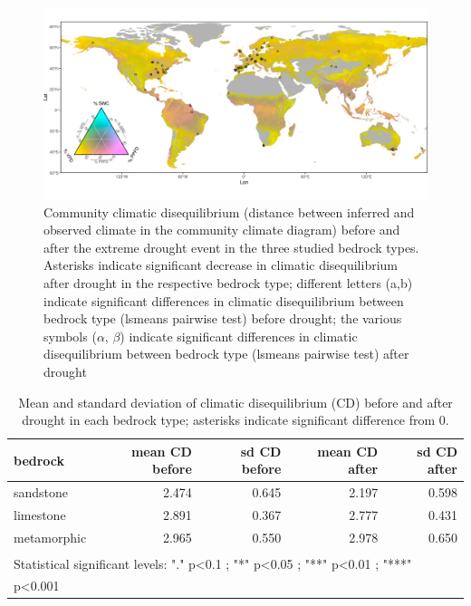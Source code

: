 \documentclass[11pt,twoside]{reedthesis}
\begin{document}
\setlength{\abovecaptionskip}{10pt}
\begin{figure}[hbt!]

{\centering \includegraphics[width=0.85\linewidth]{figure/CH4/figure3} 

}

\caption[Community climatic disequilibrium before and after the extreme drought event]{Community climatic disequilibrium (distance between inferred and observed climate in the community climate diagram) before and after the extreme drought event in the three studied bedrock types. Asterisks indicate significant decrease in climatic disequilibrium after drought in the respective bedrock type; different letters (a,b) indicate significant differences in climatic disequilibrium between bedrock type (lsmeans pairwise test) before drought; the various symbols ($\alpha$, $\beta$) indicate significant differences in climatic disequilibrium between bedrock type (lsmeans pairwise test) after drought}\label{fig:Ch4plot3}
\end{figure}
\begin{table}[H]

\caption[Mean and standard deviation of Climatic Disequilibrium before and after drought]{\label{tab:unnamed-chunk-9}Mean and standard deviation of climatic disequilibrium (CD) before and after drought in each bedrock type; asterisks indicate significant difference from 0. }
\centering
\fontsize{8}{10}\selectfont
\begin{tabular}[t]{lrrrr}
\toprule
bedrock & mean CD before & sd CD before & mean CD after & sd CD after\\
\midrule
sandstone & 2.474 & 0.645 & 2.197 & 0.598\\
limestone & 2.891 & 0.367 & 2.777 & 0.431\\
metamorphic & 2.965 & 0.550 & 2.978 & 0.650\\
\bottomrule
\multicolumn{5}{l}{\textsuperscript{} Statistical significant levels: "." p<0.1 ; "*" p<0.05 ; "**" p<0.01 ; "***"}\\
\multicolumn{5}{l}{p<0.001}\\
\end{tabular}
\end{table}
\end{document}
